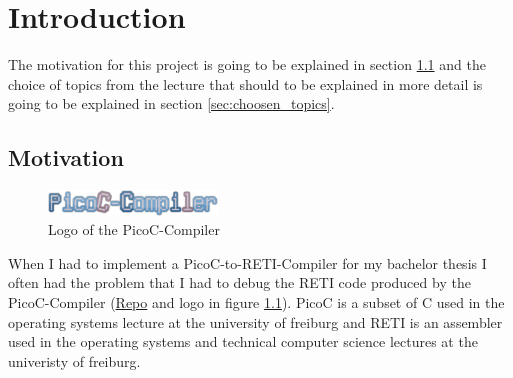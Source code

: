 \documentclass{report}
\begin{document}
\fontsize{10pt}{11pt}\selectfont
{}



\tableofcontents
\thispagestyle{empty}
\clearpage
\pagestyle{plain}

\listoffigures
\newpage
\listoftables

\clearpage
{}
\pagestyle{default}

\chapter{Introduction}
\label{sec:introduction}

The motivation for this project is going to be explained in section \ref{sec:motivation} and the choice of topics from the lecture that should to be explained in more detail is going to be explained in section \ref{sec:choosen_topics}.

\section{Motivation}
\label{sec:motivation}

\begin{figure}
	\centering
	\includegraphics[width=0.4\textwidth]{./figures/picoc_compiler.png}
	\caption{Logo of the PicoC-Compiler}
	\label{fig:logo of the picoc compiler}
  \vspace{0.25cm}
\end{figure}

When I had to implement a PicoC-to-RETI-Compiler for my bachelor thesis I often had the problem that I had to debug the RETI code produced by the \alert{PicoC-Compiler} (\href{https://github.com/matthejue/PicoC-Compiler/tree/missing_semester_project}{Repo} and logo in figure \ref{fig:logo of the picoc compiler}). \alert{PicoC} is a subset of C used in the operating systems lecture at the university of freiburg and \alert{RETI} is an assembler used in the operating systems and technical computer science lectures at the univeristy of freiburg.
\end{document}
